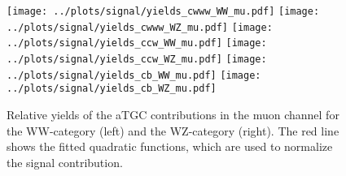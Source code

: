 \begin{figure}
	\centering
		\texttt{[image: ../plots/signal/yields\_cwww\_WW\_mu.pdf]}
		\texttt{[image: ../plots/signal/yields\_cwww\_WZ\_mu.pdf]}
		\texttt{[image: ../plots/signal/yields\_ccw\_WW\_mu.pdf]}
		\texttt{[image: ../plots/signal/yields\_ccw\_WZ\_mu.pdf]}
		\texttt{[image: ../plots/signal/yields\_cb\_WW\_mu.pdf]}
		\texttt{[image: ../plots/signal/yields\_cb\_WZ\_mu.pdf]}
	\caption[Relative yields of the aTGC contributions in the muon channel]{Relative yields of the aTGC contributions in the muon channel for the WW-category (left) and the WZ-category (right). The red line shows the fitted quadratic functions, which are used to normalize the signal contribution.}
	\label{fig:signal:atgcyields_mu}
\end{figure}

